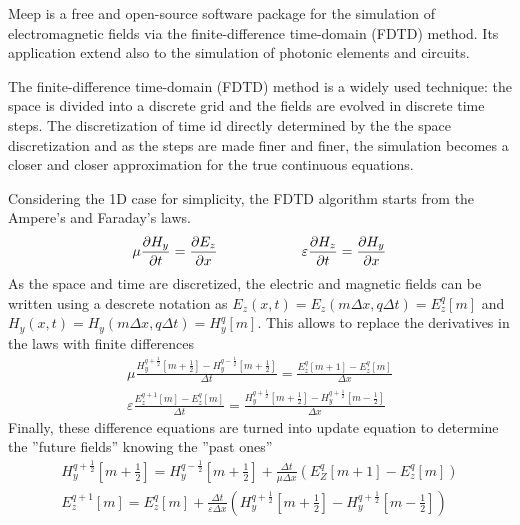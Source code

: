 Meep is a free and open-source software package for the simulation of electromagnetic fields via the finite-difference time-domain (FDTD) method.
Its application extend also to the simulation of photonic elements and circuits.  

The finite-difference time-domain (FDTD) method is a widely used technique: the space is divided into a discrete grid and the fields are evolved in discrete time steps.
The discretization of time id directly determined by the the space discretization and as the steps are made finer and finer, the simulation becomes a closer and closer approximation for the true continuous equations.

Considering the 1D case for simplicity, the FDTD algorithm starts from the Ampere's and Faraday's laws.
\begin{equation}
    \mu \pdv{H_y}{t} = \pdv{E_z}{x} \qquad\qquad\qquad \varepsilon \pdv{H_z}{t} = \pdv{H_y}{x}
\end{equation}
As the space and time are discretized, the electric and magnetic fields can be written using a descrete notation as \(E_z(x, t) = E_z (m\Delta x, q \Delta t) = E_z^q[m]\) and \(H_y(x, t) = H_y(m\Delta x, q \Delta t) = H_y^q[m]\). This allows to replace the derivatives in the laws with finite differences
\begin{align}
    \mu \frac{H_y^{q+\frac{1}{2}}[m+\frac{1}{2}] - H_y^{q-\frac{1}{2}}[m+\frac{1}{2}]}{\Delta t} = \frac{E_z^q[m+1] - E_z^q[m]}{\Delta x}
    \\
    \varepsilon\frac{E_z^{q+1}[m] - E_z^q[m]}{\Delta t} = \frac{H_y^{q+\frac{1}{2}}[m+\frac{1}{2}] - H_y^{q+\frac{1}{2}}[m-\frac{1}{2}]}{\Delta x}
\end{align}
Finally, these difference equations are turned into update equation to determine the ''future fields'' knowing the ''past ones''
\begin{align}
    H_y^{q+\frac{1}{2}} \left[ m+\frac{1}{2} \right] = H_y^{q-\frac{1}{2}} \left[ m+\frac{1}{2} \right] + \frac{\Delta t}{\mu \Delta x} \left( E_Z^q[m+1] - E_z^q[m] \right)
    \\
    E_z^{q+1} [m] = E_z^q[m] + \frac{\Delta t}{\varepsilon \Delta x} \left( H_y^{q+\frac{1}{2}}\left[ m+\frac{1}{2} \right] - H_y^{q+\frac{1}{2}}\left[ m-\frac{1}{2} \right] \right)
\end{align}